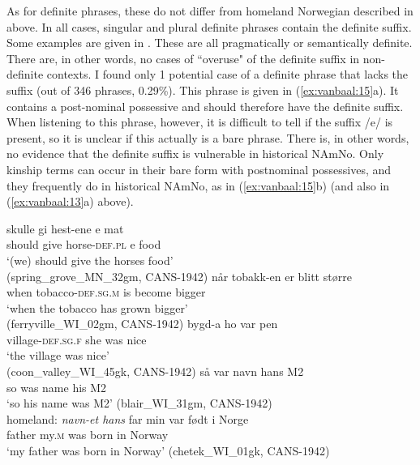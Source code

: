 \documentclass[output=paper]{langscibook}
\begin{document}
As for definite phrases, these do not differ from homeland Norwegian described in  above. In all cases, singular and plural definite phrases contain the definite suffix. Some examples are given in . These are all pragmatically or semantically definite. There are, in other words, no cases of ``overuse" of the definite suffix in non-definite contexts. I found only 1 potential case of a definite phrase that lacks the suffix (out of 346 phrases, 0.29\%). This phrase is given in (\ref{ex:vanbaal:15}a). It contains a post-nominal possessive and should therefore have the definite suffix. When listening to this phrase, however, it is difficult to tell if the suffix /e/ is present, so it is unclear if this actually is a bare phrase. There is, in other words, no evidence that the definite suffix is vulnerable in historical NAmNo. Only kinship terms can occur in their bare form with postnominal possessives, and they frequently do in historical NAmNo, as in (\ref{ex:vanbaal:15}b) (and also in (\ref{ex:vanbaal:13}a) above).
 

\ea \label{ex:vanbaal:14}
\ea\label{ex:vanbaal:14a}
\gll skulle gi hest-ene e mat \\
    should give horse-\textsc{def.pl} e food \\
\glt `(we) should give the horses food' \\
(spring\_grove\_MN\_32gm, CANS-1942)
\ex \label{ex:vanbaal:14b}
\gll når tobakk-en er blitt større \\
    when tobacco-\textsc{def.sg.m} is become bigger \\
\glt `when the tobacco has grown bigger' \\
(ferryville\_WI\_02gm, CANS-1942)
\ex \label{ex:vanbaal:14cs}
\gll bygd-a ho var pen\footnotemark \\
    village-\textsc{def.sg.f} she was nice \\
\glt `the village was nice' \\
(coon\_valley\_WI\_45gk, CANS-1942)
\z 
\ex \label{ex:vanbaal:15}
\ea \label{ex:vanbaal:15a}
\gll så var navn hans M2 \\
    so was name his M2 \\
\glt `so his name was M2' (blair\_WI\_31gm, CANS-1942) \\
homeland: \textit{navn-et hans} 
\ex \label{ex:vanbaal:15b}
\gll far min var født i Norge \\
    father my.\textsc{m} was born in Norway \\
\glt `my father was born in Norway' (chetek\_WI\_01gk, CANS-1942)
\z 
\z 
\end{document}
